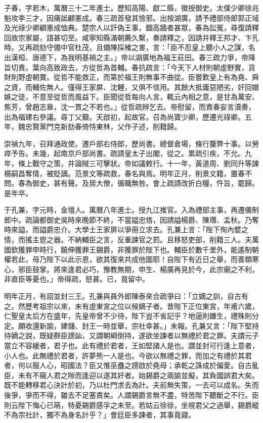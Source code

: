 \begin{pinyinscope}
子春，字若木，萬曆三十二年進士。歷知高陽、獻二縣，徵授御史。太僕少卿徐兆魁攻李三才，因痛詆顧憲成。春三疏首發其憸邪。出按湖廣，請予禮部侍郎郭正域及光祿少卿顧憲成恤典。楚宗人以訐偽王事，錮高牆者甚眾，春為訟冤，尋復請釋回故宗家屬，語甚切至。咸寧知縣滿朝薦久繫，奏請釋之，因請并釋王邦才、卞孔時。又再疏劾守備中官杜茂，且備陳採榷之害，言：「臣不忍皇上聽小人之謀，名出漢桓、唐德下，為我明基禍之主。」帝以湖廣地為福王莊田。春三疏力爭，帝降旨切責。葉向高致政去，方從哲為首輔。春抗疏言：「今天下人材則朝虛野實，貨財則野虛朝實。從哲不能救正，而第於福王則無事不曲從。臣嘗歎皇上有為堯、舜之資，而輔佐無人。僅得王家屏、沈鯉，又俱不信用。其餘大抵庸惡陋劣，奸回媢嫉之徒，不意至從哲而風益下。臣聞從哲每向人言，輒云內相之意，是甘為萬安、焦芳，曾趙志皋，沈一貫之不若也。」從哲疏辨乞去。帝慰留，而責春妄言瀆奏，出為福建右參議。尋丁父艱。天啟初，起故官。召為尚寶少卿，歷遷光祿卿。五年，魏忠賢黨門克新劾春倚恃東林，父作子述，削籍歸。

崇禎九年，召拜通政使。遷戶部右侍郎，歷尚書。總督倉場，條行釐弊十事。以勞瘁予告。未幾，起南京戶部尚書。疏請皇太子出閣，從之。累疏引疾，不允。九年，條上戰守之策，并論賊三可擊狀。帝如議敕行。十一年，黃道周、劉同升等諫楊嗣昌奪情，被貶謫。范景文等疏救，春名與焉。明年正月，削景文籍，置春不問。春為御史，甚有聲。及居大僚，循職無咎。會上疏請改折白糧，忤旨，罷歸。是年卒。

于孔兼，字元時，金壇人。萬曆八年進士。授九江推官。入為禮部主事，再遷儀制郎中。疏論都御史吳時來晚節不終，不當謚忠恪，因請謚楊爵、陳瓚、孟秋。乃奪時來謚，而謚爵忠介。大學士王家屏以爭冊立求去。孔兼上言：「陛下徇內嬖之情，而搖主鬯之器。不納輔臣之言，反重諫官之罰。且移怒吏部，削籍三人。夫萬國欽獲罪申時行，饒伸獲罪王錫爵，非獲罪於陛下也。輔臣於數千里外，能遙制朝權若此，毋乃陛下以此示恩，欲其復來共成他圖耶！自陛下有近日之舉，而善類寒心，邪臣鼓掌。將來逢君必巧，豫教無期，申生、楊廣再見於今，此宗廟之不利，非直臣等憂也。」帝得疏，怒甚。已，竟留中。

明年正月，有詔並封三王。孔兼與員外郎陳泰來合疏爭曰：「立嫡之訓，自古有之。然歷考祖宗以來，未有虛東宮之位以候嫡子者。昔陛下正位東宮，年甫六歲，仁聖皇太后方在盛年，先皇帝曾不少待，陛下豈不省記乎？地逼則嫌生，禮殊則分定。願收還新諭，建儲、封王一時並舉，宗社幸甚。」未報。孔兼又言：「陛下堅持待嫡之說，既疑群臣謗訕，又謂朝綱倒持，遂欲坐諫者以無禮於君之罪。夫謂元子當立不容緩者，君子也。此有禮於君者，王如堅諸人是也。謂並封可行逢上意者，小人也。此無禮於君者，許夢熊一人是也。今欲以無禮之罪，而加之有禮於其君者，何以服人心，昭國法？臣又惟巫蠱之謗啟於堯母；承乾之誅成於偏愛。自古亂臣，未有不窺人君之隙而逢迎以遂其奸者。始錫爵之兩諭並擬，其負國誤君大矣。既不能轉移君心決計於初，乃以杜門求去為計。夫前無失策，一去可以成名。失而後爭，爭而不得，雖去不足塞責矣。人謂錫爵言無不盡，特苦陛下聽斷之不行。臣則云陛下悔心已萌，特憂錫爵感孚之未至。若姑云徐徐，坐視君父之過舉，錫爵縱不為宗社計，獨不為身名計乎？」會廷臣多諫者，其事竟寢。


\end{pinyinscope}
